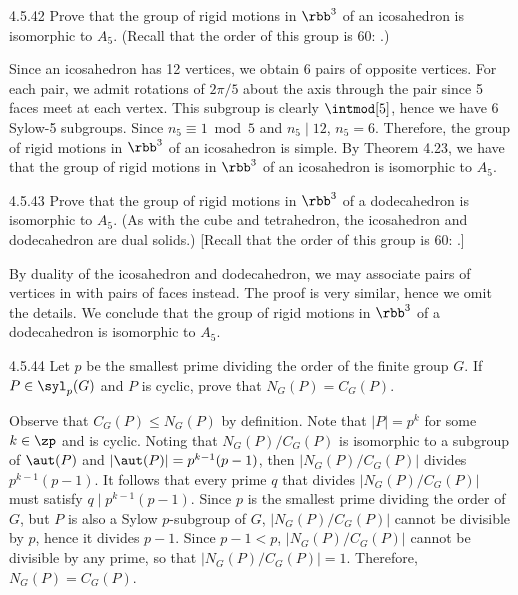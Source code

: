 \begin{exercise}{4.5.42}
	Prove that the group of rigid motions in $\rbb^3$ of an icosahedron is isomorphic to $A_5$. (Recall that the order of this group is 60: .)
\end{exercise}

\begin{sol}
	Since an icosahedron has 12 vertices, we obtain 6 pairs of opposite vertices.
	For each pair, we admit rotations of $2\pi/5$ about the axis through the pair since 5 faces meet at each vertex.
	This subgroup is clearly $\intmod[5]$, hence we have 6 Sylow-5 subgroups.
	Since $n_5 \equiv 1 \bmod 5$ and $n_5 \mid 12$, $n_5 = 6$.
	Therefore, the group of rigid motions in $\rbb^3$ of an icosahedron is simple.
	By Theorem 4.23, we have that the group of rigid motions in $\rbb^3$ of an icosahedron is isomorphic to $A_5$.
\end{sol}

\begin{exercise}{4.5.43}
	Prove that the group of rigid motions in $\rbb^3$ of a dodecahedron is isomorphic to $A_5$. (As with the cube and tetrahedron, the icosahedron and dodecahedron are dual solids.) [Recall that the order of this group is 60: .]
\end{exercise}

\begin{sol}
	By duality of the icosahedron and dodecahedron, we may associate pairs of vertices in  with pairs of faces instead.
	The proof is very similar, hence we omit the details.
	We conclude that the group of rigid motions in $\rbb^3$ of a dodecahedron is isomorphic to $A_5$.
\end{sol}

\begin{exercise}{4.5.44}
	Let $p$ be the smallest prime dividing the order of the finite group $G$.
	If $P \in \syl_p(G)$ and $P$ is cyclic, prove that $N_G(P) = C_G(P)$.
\end{exercise}

\begin{sol}
	Observe that $C_G(P) \leq N_G(P)$ by definition.
	Note that $|P| = p^k$ for some $k \in \zp$ and is cyclic.
	Noting that $N_G(P)/C_G(P)$ is isomorphic to a subgroup of $\aut(P)$ and $|\aut(P)| = p^{k - 1}(p - 1)$, then $|N_G(P)/C_G(P)|$ divides $p^{k - 1}(p - 1)$.
	It follows that every prime $q$ that divides $|N_G(P)/C_G(P)|$ must satisfy $q \mid p^{k - 1}(p - 1)$.
	Since $p$ is the smallest prime dividing the order of $G$, but $P$ is also a Sylow $p$-subgroup of $G$, $|N_G(P)/C_G(P)|$ cannot be divisible by $p$, hence it divides $p - 1$.
	Since $p - 1 < p$, $|N_G(P)/C_G(P)|$ cannot be divisible by any prime, so that $|N_G(P)/C_G(P)| = 1$.
	Therefore, $N_G(P) = C_G(P)$.
\end{sol}

